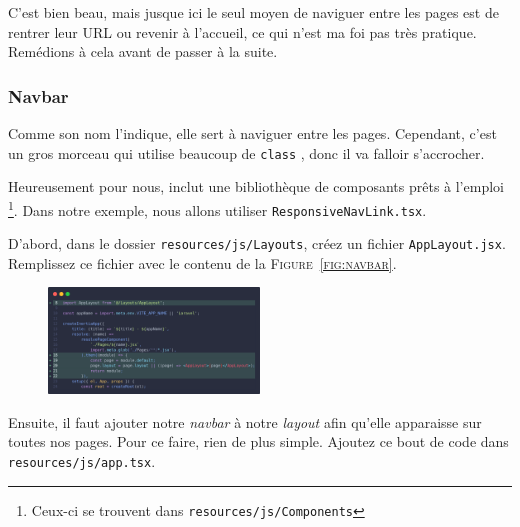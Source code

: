 C'est bien beau, mais jusque ici le seul moyen de naviguer entre les pages est de rentrer leur URL ou revenir à l'accueil, ce qui n'est ma foi pas très pratique. Remédions à cela avant de passer à la suite.

\subsubsection[Navbar]{Navbar}\label{sec:navbar}



Comme son nom l'indique, elle sert à naviguer entre les pages. Cependant, c'est un gros morceau qui utilise beaucoup de \verb|class| \tailwind{}, donc il va falloir s'accrocher.

Heureusement pour nous, \react{} inclut une bibliothèque de composants prêts à l'emploi \footnote{Ceux-ci se trouvent dans \texttt{resources/js/Components}}. Dans notre exemple, nous allons utiliser \texttt{ResponsiveNavLink.tsx}.

D'abord, dans le dossier \verb|resources/js/Layouts|, créez un fichier \verb|AppLayout.jsx|. Remplissez ce fichier avec le contenu de la \textsc{Figure~\ref{fig:navbar}}.

\begin{figure}
    \vspace{-1.2cm}
    \includegraphics[width=0.5\textwidth]{figures-C1/app.jsx.png}
\end{figure}

\enlargethispage{2\baselineskip}

Ensuite, il faut ajouter notre \textit{navbar} à notre \textit{layout} afin qu'elle apparaisse sur toutes nos pages. Pour ce faire, rien de plus simple. Ajoutez ce bout de code dans \texttt{resources/js/app.tsx}.

